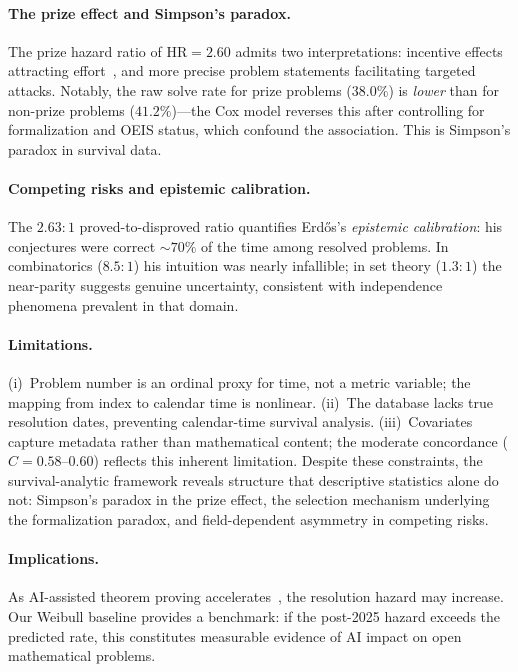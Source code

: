 \documentclass[11pt]{article}
\newcommand{\HR}{\mathrm{HR}}
\begin{document}
\paragraph{The prize effect and Simpson's paradox.}
The prize hazard ratio of $\HR = 2.60$ admits two interpretations:
incentive effects attracting effort~\cite{kremer1998}, and more
precise problem statements facilitating targeted attacks.
Notably, the raw solve rate for prize problems ($38.0\%$) is
\emph{lower} than for non-prize problems ($41.2\%$)---the Cox model
reverses this after controlling for formalization and OEIS status,
which confound the association. This is Simpson's paradox in
survival data.

\paragraph{Competing risks and epistemic calibration.}
The $2.63{:}1$ proved-to-disproved ratio quantifies Erd\H{o}s's
\emph{epistemic calibration}: his conjectures were correct
$\sim\!70\%$ of the time among resolved problems. In combinatorics
($8.5{:}1$) his intuition was nearly infallible; in set theory
($1.3{:}1$) the near-parity suggests genuine uncertainty, consistent
with independence phenomena prevalent in that domain.

\paragraph{Limitations.}
(i)~Problem number is an ordinal proxy for time, not a metric variable;
the mapping from index to calendar time is nonlinear.
(ii)~The database lacks true resolution dates, preventing
calendar-time survival analysis.
(iii)~Covariates capture metadata rather than mathematical content;
the moderate concordance ($C = 0.58$--$0.60$) reflects this
inherent limitation.
Despite these constraints, the survival-analytic framework reveals
structure that descriptive statistics alone do not: Simpson's paradox
in the prize effect, the selection mechanism underlying the
formalization paradox, and field-dependent asymmetry in competing risks.

\paragraph{Implications.}
As AI-assisted theorem proving accelerates~\cite{trinh2024,
yang2024}, the resolution hazard may increase. Our Weibull baseline
provides a benchmark: if the post-2025 hazard exceeds the predicted
rate, this constitutes measurable evidence of AI impact on open
mathematical problems.
\end{document}
